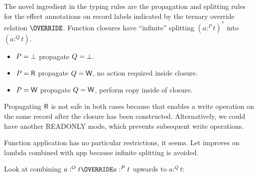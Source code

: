 \documentclass{llncs}
\begin{document}
The novel ingredient in the typing rules are the propagation and splitting rules for the effect annotations on
record labels indicated by the ternary override relation $\OVERRIDE$.
Function closures have ``infinite'' splitting $(a :^P t)^*$ into $(a :^Q t)$.
\begin{itemize}
\item $P = \bot$ propagate $Q=\bot$.
\item $P = \textsf{R}$ propagate $Q = \textsf{W}$, no action required inside closure.
\item $P = \textsf{W}$ propagate $Q = \textsf{W}$, perform copy inside of closure.
\end{itemize}
 Propagating $\textsf{R}$ is not safe in both cases because that enables a write operation on the same
 record after the closure has been constructed. Alternatively, we could have another READONLY mode,
 which prevents subsequent write operations.

Function application has no particular restrictions, it seems.
Let improves on lambda combined with app because infinite splitting is avoided.

Look at combining $a :^O t \OVERRIDE a:^P t$ upwards to $a : ^Q t$:
\end{document}

